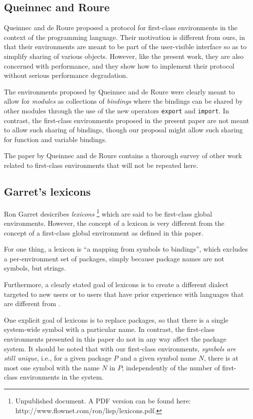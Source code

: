 \subsection{Queinnec and Roure}

Queinnec and de Roure \cite{Queinnec:1996:SCT:232627.232653} proposed
a protocol for first-class environments in the context of the
\scheme{} programming language.  Their motivation is different from
ours, in that their environments are meant to be part of the
user-visible interface so as to simplify sharing of various objects.
However, like the present work, they are also concerned with
performance, and they show how to implement their protocol without
serious performance degradation.

The environments proposed by Queinnec and de Roure were clearly meant
to allow for \emph{modules} as collections of \emph{bindings} where
the bindings can be shared by other modules through the use of the new
operators \texttt{export} and \texttt{import}.  In contrast, the
first-class environments proposed in the present paper are not meant
to allow such sharing of bindings, though our proposal might allow
such sharing for function and variable bindings.

The paper by Queinnec and de Roure contains a thorough survey of other
work related to first-class environments that will not be repeated
here.

\subsection{Garret's lexicons}

Ron Garret desicribes \emph{lexicons}%
\footnote{Unpublished document.  A PDF version can be found here:
  http://www.flownet.com/ron/lisp/lexicons.pdf.}
which are said to be first-class global environments.  However, the
concept of a lexicon is very different from the concept of a
first-class global environment as defined in this paper.

For one thing, a lexicon is ``a mapping from symbols to bindings'',
which excludes a per-environment set of packages, simply because
package names are not symbols, but strings.

Furthermore, a clearly stated goal of lexicons is to create a
different \lisp{} dialect targeted to new users or to users that have
prior experience with languages that are different from \lisp{}.

One explicit goal of lexicons is to replace \commonlisp{} packages, so
that there is a single system-wide symbol with a particular name.  In
contrast, the first-class environments presented in this paper do not
in any way affect the package system.  It should be noted that with
our first-class environments, \emph{symbols are still unique}, i.e.,
for a given package $P$ and a given symbol name $N$, there is at most
one symbol with the name $N$ in $P$; independently of the number of
first-class environments in the system.

